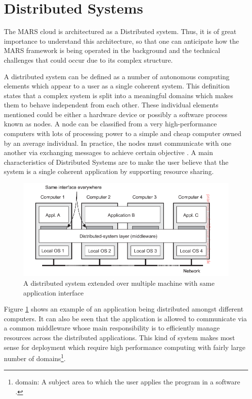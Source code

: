 \section{Distributed Systems}

    The MARS cloud is architectured as a Distributed system. Thus, it is of great importance to understand
    this architecture, so that one can anticipate how the MARS framework is being operated in the background and
    the technical challenges that could occur due to its complex structure.
    \par
    A distributed system can be defined as a number of autonomous computing elements which 
    appear to a user as a single coherent system. 
    This definition states that a complex system is split into a meaningful domains which makes them to behave independent from each other.
    These individual elements mentioned could be either a hardware device or possibly a software process known as nodes. A node can
    be classified from a very high-performance computers with lots of processing power to a simple and cheap computer owned by an average individual. 
    In practice, the nodes must communicate with one another via exchanging messages to achieve certain objective \cite[p.~2]{DistributedSystems}.
    A main characteristics of Distributed Systems are to make the user believe that the system is a single coherent application by supporting 
    resource sharing.

    \begin{figure}[htbp!]
        \centering \includegraphics[scale=0.94]{grafiken/distributedSystem.png}
        \caption{A distributed system extended over multiple machine with same application 
        interface \cite[p.~5]{DistributedSystems}}
        \label{fig:distributedSystem}
    \end{figure}

    \newpage
    \par
        Figure \ref{fig:distributedSystem} shows an example of an application being 
        distributed amongst different computers. It can also be seen that the application
        is allowed to communicate via a common middleware whose main responsibility is to
        efficiently manage resources across the distributed applications. This kind of system
        makes most sense for deployment which require high performance computing with fairly
        large number of domains\footnote{domain: A subject area to which the user applies the program in a 
        software \cite{DDD}.}.

